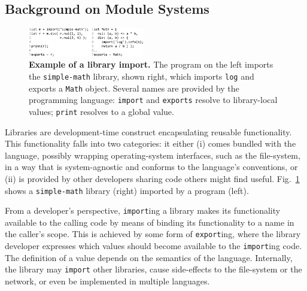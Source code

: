 \documentclass[letterpaper,twocolumn,10pt]{article}
\newcommand{\ttt}[1]{\texttt{#1}}
\begin{document}
\subsection{Background on Module Systems}
\label{bg1}

\begin{figure}[t]
\raggedleft 
\includegraphics[width=0.45\textwidth]{./figs/lya_ex1.pdf}
\caption{
  \textbf{Example of a library import.}
  \textmd{
    The program on the left imports the \ttt{simple-math} library, shown right, which imports \ttt{log} and exports a \ttt{Math} object.
    Several names are provided by the programming language:
      \ttt{import} and \ttt{exports} resolve to library-local values; \ttt{print} resolves to a global value.
  }
  \vspace{-8mm}
}
\label{fig:ex1}
\end{figure}


Libraries are development-time construct encapsulating reusable functionality.
This functionality falls into two categories:
  it either (i) comes bundled with the language, possibly wrapping operating-system interfaces, such as the file-system, in a way that is system-agnostic and conforms to the language's conventions,
  or (ii) is provided by other developers sharing code others might find useful.
Fig.~\ref{fig:ex1} shows a \ttt{simple-math} library (right) imported by a program (left).

From a developer's perspective, \ttt{import}ing a library makes its functionality available to the calling code by means of binding its functionality to a name in the caller's scope.
This is achieved by some form of \ttt{export}ing, where the library developer expresses which values should become available to the \ttt{import}ing code.
The definition of a value depends on the semantics of the language. 
Internally, the library may \ttt{import} other libraries, cause side-effects to the file-system or the network, or even be implemented in multiple languages.
\end{document}
